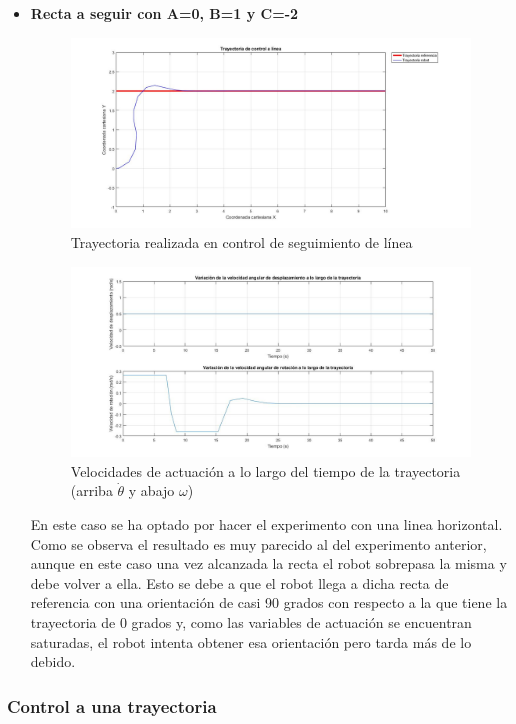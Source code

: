 \documentclass[a4paper,twoside]{article}
\begin{document}
\begin{itemize}
	\item \textbf{Recta a seguir con A=0, B=1 y C=-2}
	\begin{figure}[H]
		\centering
		\includegraphics[width=1\textwidth]{control_linea_2}
		\caption{Trayectoria realizada en control de seguimiento de línea}
	\end{figure}
	\begin{figure}[H]
		\centering
		\includegraphics[width=1\textwidth]{control_linea_2_2}
		\caption{Velocidades de actuación a lo largo del tiempo de la trayectoria (arriba $\dot{\theta}$ y abajo $\omega$)}
	\end{figure}
	En este caso se ha optado por hacer el experimento con una linea horizontal. Como se observa el resultado es muy parecido al del experimento anterior, aunque en este caso una vez alcanzada la recta el robot sobrepasa la misma y debe volver a ella. Esto se debe a que el robot llega a dicha recta de referencia con una orientación de casi 90 grados con respecto a la que tiene la trayectoria de 0 grados y, como las variables de actuación se encuentran saturadas, el robot intenta obtener esa orientación pero tarda más de lo debido.
	\end{itemize}
	\subsubsection{Control a una trayectoria}
\end{document}
